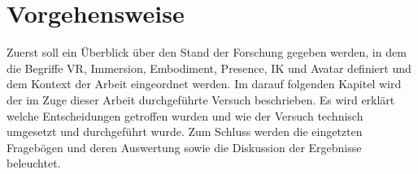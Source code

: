 \section{Vorgehensweise}
Zuerst soll ein Überblick über den Stand der Forschung gegeben werden, in dem die Begriffe VR, Immersion, Embodiment, Presence, IK und Avatar definiert und dem Kontext der Arbeit eingeordnet werden. Im darauf folgenden Kapitel wird der im Zuge dieser Arbeit durchgeführte Versuch beschrieben. Es wird erklärt welche Entscheidungen getroffen wurden und wie der Versuch technisch umgesetzt und durchgeführt wurde. Zum Schluss werden die eingetzten Fragebögen und deren Auswertung sowie die Diskussion der Ergebnisse beleuchtet.